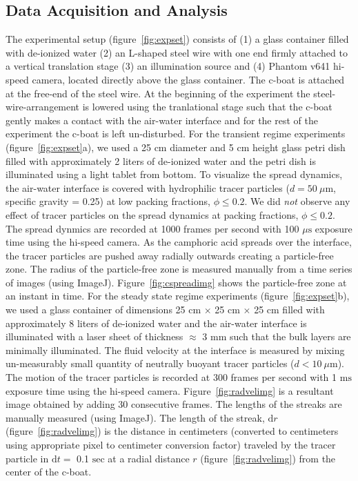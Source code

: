 \documentclass[aps, twocolumn, floatfix, superscriptaddress]{revtex4}
\newcommand{\td}[1]{\mathrm{d}#1}
\begin{document}
\subsection{Data Acquisition and Analysis}
The experimental setup (figure~\ref{fig:expset}) consists of (1) a glass container filled with de-ionized water (2) an L-shaped steel wire with one end firmly attached to a vertical translation stage (3) an illumination source and (4) Phantom v641 hi-speed camera, located directly above the glass container. The c-boat is attached at the free-end of the steel wire. At the beginning of the experiment the steel-wire-arrangement is lowered using the tranlational stage such that the c-boat gently makes a contact with the air-water interface and for the rest of the experiment the c-boat is left un-disturbed. For the transient regime experiments (figure~\ref{fig:expset}a), we used a 25 $\mathrm{cm}$ diameter and 5 $\mathrm{cm}$ height glass petri dish filled with approximately 2 liters of de-ionized water and the petri dish is illuminated using a light tablet from bottom. To visualize the spread dynamics, the air-water interface is covered with hydrophilic tracer particles ($d = 50\ \mu \mathrm{m}$, specific gravity = 0.25) at low packing fractions, $\phi \leq 0.2$. We did \emph{not} observe any effect of tracer particles on the spread dynamics at packing fractions, $\phi \leq 0.2$. The spread dynmics are recorded at 1000 frames per second with 100 $\mu \mathrm{s}$ exposure time using the hi-speed camera. As the camphoric acid spreads over the interface, the tracer particles are pushed away radially outwards creating a particle-free zone. The radius of the particle-free zone is measured manually from a time series of images (using ImageJ). Figure~\ref{fig:cspreadimg} shows the particle-free zone at an instant in time. For the steady state regime experiments (figure~\ref{fig:expset}b), we used a glass container of dimensions 25 $\mathrm{cm}$ $\times$ 25 $\mathrm{cm}$ $\times$ 25 $\mathrm{cm}$ filled with approximately 8 liters of de-ionized water and the air-water interface is illuminated with a laser sheet of thickness $\approx$ 3 $\mathrm{mm}$ such that the bulk layers are minimally illuminated. The fluid velocity at the interface is measured by mixing un-measurably small quantity of neutrally buoyant tracer particles ($d < 10\ \mu \mathrm{m}$). The motion of the tracer particles is recorded at 300 frames per second with 1 $\mathrm{ms}$ exposure time using the hi-speed camera. Figure~\ref{fig:radvelimg} is a resultant image obtained by adding 30 consecutive frames. The lengths of the streaks are manually measured (using ImageJ). The length of the streak, $\td{r}$ (figure~\ref{fig:radvelimg}) is the distance in centimeters (converted to centimeters using appropriate pixel to centimeter conversion factor) traveled by the tracer particle in $\td{t}=$ 0.1 $\mathrm{sec}$ at a radial distance $r$ (figure~\ref{fig:radvelimg}) from the center of the c-boat. 
\end{document}
